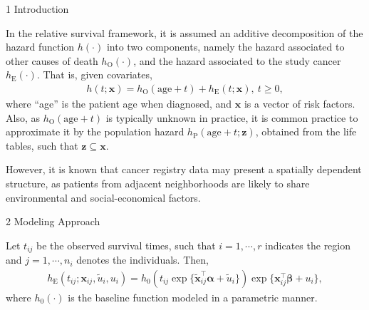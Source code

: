 \documentclass[12pt]{beamer}
\begin{document}
	\begin{frame}[t]
		\vspace{-36pt}
		\begin{columns}[t]
			\begin{column}{0.30\textwidth} \justifying %
			\begin{block}{\Large 1 Introduction} \justifying \vspace{12pt}				
			
			In the relative survival framework, it is assumed an additive decomposition of the hazard function $h(\cdot)$ into two components, namely the hazard associated to other causes of death $h_{\text{O}}(\cdot)$, and the hazard associated to the study cancer $h_{\text{E}}(\cdot)$. That is, given covariates,
			\begin{align} \label{eq:main-haz}
				h(t; \mathbf{x}) = h_{\text{O}}(\text{age} + t) + h_{\text{E}}(t; \mathbf{x}),~ t \geq 0,
			\end{align}
			where ``age'' is the patient age when diagnosed, and $\mathbf{x}$ is a vector of risk factors. Also, as $h_{\text{O}}(\text{age} + t)$ is typically unknown in practice, it is common practice to approximate it by the population hazard $h_{\text{P}}(\text{age} + t; \mathbf{z})$, obtained from the life tables, such that $\mathbf{z} \subseteq \mathbf{x}$.
			
			\vspace{12pt}
			
			However, it is known that cancer registry data may present a spatially dependent structure, as patients from adjacent neighborhoods are likely to share environmental and social-economical factors.
				
			\vspace{18pt}
			
			\end{block}
			
			\begin{block}{\Large 2 Modeling Approach} \justifying \vspace{12pt}				
								
				Let $t_{ij}$ be the observed survival times, such that $i = 1, \cdots, r$ indicates the region and $j = 1, \cdots, n_i$ denotes the individuals. Then,
				\begin{align} \label{eq:exc-haz}
					h_{\text{E}}(t_{ij}; \mathbf{x}_{ij}, \tilde{u}_i, u_i) = h_0(t_{ij} \exp\{\tilde{\mathbf{x}}_{ij}^{\top} \boldsymbol{\alpha} + \tilde{u}_i\}) \exp\{\mathbf{x}_{ij}^{\top} \boldsymbol{\beta} + u_i\},
				\end{align}
				where $h_0(\cdot)$ is the baseline function modeled in a parametric manner.
				

\end{block}
\end{column}
\end{columns}
\end{frame}
\end{document}
